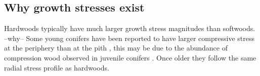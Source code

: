 \subsection{Why growth stresses exist}
Hardwoods typically have much larger growth stress magnitudes than softwoods.
--why-- \cite{barnett1981xylem} Some young conifers have been
reported to have larger compressive stress at the periphery than at the pith \cite{jacobs1945l}, this may be due to the abundance of compression wood observed in juvenile conifers \cite{timell1986compression}. Once older they follow the same radial stress profile
as hardwoods.